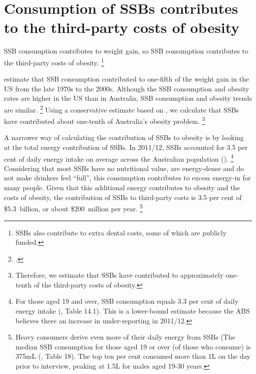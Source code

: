 \documentclass[embargoed]{grattan}
\begin{document}
\section{Consumption of SSBs contributes to the third-party costs of obesity}\label{consumption-of-ssbs-contributes-to-the-third-party-costs-of-obesity}

SSB consumption contributes to weight gain, so SSB consumption contributes to the third-party costs of obesity.%
\footnote{SSBs also contribute to extra dental costs, some of which are publicly funded.}

\textcite{Woodward-Lopez2010whatextenthave} estimate that SSB consumption contributed to one-fifth of the weight gain in the US from the late 1970s to the 2000s.
Although the SSB consumption and obesity rates are higher in the US than in Australia, SSB consumption and obesity trends are similar.%
\footcites{Popkin2016Sweeteningglobaldiet}{Silver2015IdBuyEmerging} Using a conservative estimate based on \textcite{Woodward-Lopez2010whatextenthave}, we calculate that SSBs have contributed about one-tenth of Australia's obesity problem.%
\footnote{Therefore, we estimate that SSBs have contributed to approximately one-tenth of the third-party costs of obesity.}

A narrower way of calculating the contribution of SSBs to obesity is by looking at the total energy contribution of SSBs.
In 2011/12, SSBs accounted for 3.5 per cent of daily energy intake on average across the Australian population ().%
\footnote{For those aged 19 and over, SSB consumption equals 3.3 per cent of daily energy intake (\textcite{ABS20144364055007AustralianHealth}, Table 14.1).
This is a lower-bound estimate because the ABS believes there an increase in under-reporting in 2011/12.} Considering that most SSBs have no nutritional value, are energy-dense and do not make drinkers feel ``full'', this consumption contributes to excess energy-in for many people.
Given that this additional energy contributes to obesity and the costs of obesity, the contribution of SSBs to third-party costs is 3.5 per cent of \$5.3~billion, or about \$200~million per year. \footnote{Heavy consumers derive even more of their daily energy from SSBs (The median SSB consumption for those aged 19 or over (of those who consume) is 375mL (\textcite{ABS2013436405503AustralianHealth}, Table 18).
The top ten per cent consumed more than 1L on the day prior to interview, peaking at 1.5L for males aged 19-30 years.}
\end{document}
